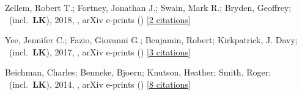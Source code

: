 \item[{\color{numcolor}\scriptsize3}] Zellem, Robert T.; Fortney, Jonathan J.; Swain, Mark R.; Bryden, Geoffrey; \etal\ (incl.\ \textbf{LK}), 2018, , arXiv e-prints () [\href{https://ui.adsabs.harvard.edu/abs/2018arXiv180307163Z}{2 citations}]

\item[{\color{numcolor}\scriptsize2}] Yee, Jennifer C.; Fazio, Giovanni G.; Benjamin, Robert; Kirkpatrick, J. Davy; \etal\ (incl.\ \textbf{LK}), 2017, , arXiv e-prints () [\href{https://ui.adsabs.harvard.edu/abs/2017arXiv171004194Y}{3 citations}]

\item[{\color{numcolor}\scriptsize1}] Beichman, Charles; Benneke, Bjoern; Knutson, Heather; Smith, Roger; \etal\ (incl.\ \textbf{LK}), 2014, , arXiv e-prints () [\href{https://ui.adsabs.harvard.edu/abs/2014arXiv1411.1754B}{8 citations}]